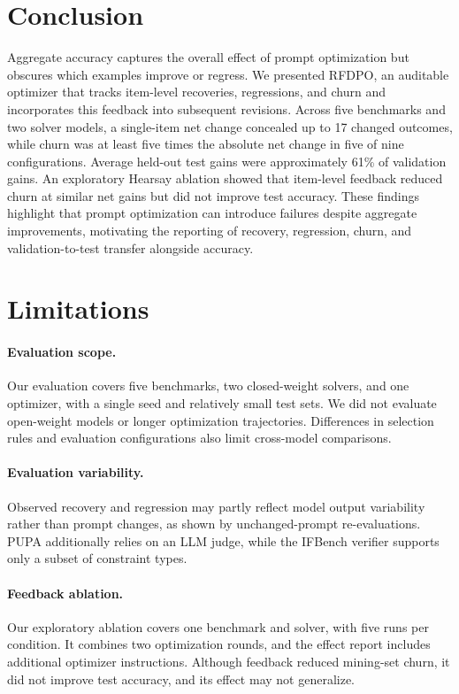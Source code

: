 \documentclass[11pt]{article}
\begin{document}
\section{Conclusion}
Aggregate accuracy captures the overall effect of prompt optimization but obscures which examples improve or regress. We presented RFDPO, an auditable optimizer that tracks item-level recoveries, regressions, and churn and incorporates this feedback into subsequent revisions. Across five benchmarks and two solver models, a single-item net change concealed up to 17 changed outcomes, while churn was at least five times the absolute net change in five of nine configurations. Average held-out test gains were approximately 61\% of validation gains. An exploratory Hearsay ablation showed that item-level feedback reduced churn at similar net gains but did not improve test accuracy. These findings highlight that prompt optimization can introduce failures despite aggregate improvements, motivating the reporting of recovery, regression, churn, and validation-to-test transfer alongside accuracy.

\section*{Limitations}
\label{sec:limitations}

\paragraph{Evaluation scope.}
Our evaluation covers five benchmarks, two closed-weight solvers, and one optimizer, with a single seed and relatively small test sets. We did not evaluate open-weight models or longer optimization trajectories. Differences in selection rules and evaluation configurations also limit cross-model comparisons.

\paragraph{Evaluation variability.}
Observed recovery and regression may partly reflect model output variability rather than prompt changes, as shown by unchanged-prompt re-evaluations. PUPA additionally relies on an LLM judge, while the IFBench verifier supports only a subset of constraint types.

\paragraph{Feedback ablation.}
Our exploratory ablation covers one benchmark and solver, with five runs per condition. It combines two optimization rounds, and the effect report includes additional optimizer instructions. Although feedback reduced mining-set churn, it did not improve test accuracy, and its effect may not generalize.
\end{document}
